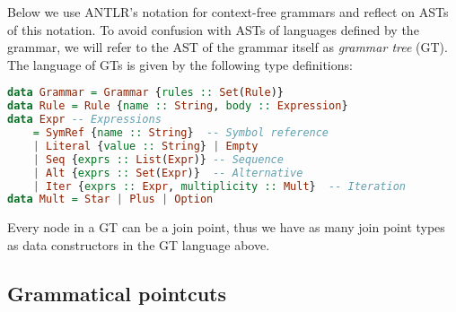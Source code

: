 \documentclass{IOS-Book-Article}     %
\newcommand{\tool}[1]{\textsc{#1}}
\begin{document}
Below we use \tool{ANTLR}'s notation for context-free grammars and reflect on ASTs of this notation. To avoid confusion with ASTs of languages defined by the grammar, we will refer to the AST of the grammar itself as \emph{grammar tree} (GT). The language of GTs is given by the following type definitions:
\begin{lstlisting}[language=Haskell]
data Grammar = Grammar {rules :: Set(Rule)}
data Rule = Rule {name :: String, body :: Expression}
data Expr -- Expressions
	= SymRef {name :: String}  -- Symbol reference
	| Literal {value :: String} | Empty
	| Seq {exprs :: List(Expr)} -- Sequence
	| Alt {exprs :: Set(Expr)}  -- Alternative
	| Iter {exprs :: Expr, multiplicity :: Mult}  -- Iteration
data Mult = Star | Plus | Option
\end{lstlisting}
Every node in a GT can be a join point, thus we have as many join point types as data constructors in the GT language above.

\subsection{Grammatical pointcuts}
\end{document}
